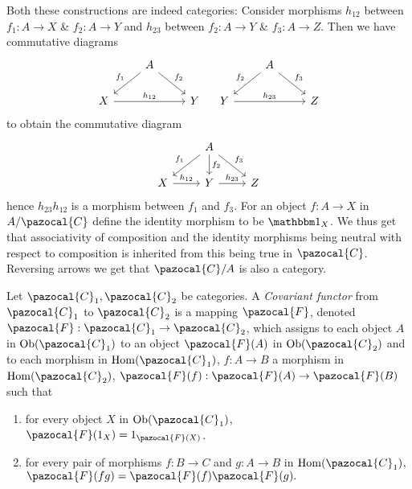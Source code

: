 \begin{remark}
    Both these constructions are indeed categories: Consider morphisms $h_{12}$ between $f_1: A\rightarrow X$ \& $f_2 : A\rightarrow Y$ and $h_{23}$ between $f_2 : A\rightarrow Y$ \& $f_3: A\rightarrow Z$. Then we have commutative diagrams
    $$\begin{tikzcd}
        & A \arrow[ld, "f_1"' ] \arrow[rd, "f_2"]\\
        X \arrow{rr}{h_{12}} & & Y
    \end{tikzcd} \quad \begin{tikzcd}  & A \arrow[ld, "f_2"' ] \arrow[rd, "f_3"]\\
        Y \arrow{rr}{h_{23}} & & Z \end{tikzcd}$$
    to obtain the commutative diagram
    $$\begin{tikzcd}
        & A \arrow[ld, "f_1"' ] \arrow[d, "f_2"] \arrow[rd, "f_3"]\\
        X \arrow[r, "h_{12}"] & Y \arrow[r, "h_{23}"] & Z
    \end{tikzcd}
    $$
    hence $h_{23}h_{12}$ is a morphism between $f_{1}$ and $f_3$. For an object $f: A \rightarrow X$ in $A/\pazocal{C}$ define the identity morphism to be $\fone_X$. We thus get that associativity of composition and the identity morphisms being neutral with respect to composition is inherited from this being true in $\pazocal{C}$. Reversing arrows we get that $\pazocal{C}/A$ is also a category.  
\end{remark}
\begin{definition}
    Let $\pazocal{C}_1,\pazocal{C}_2$ be categories. A \textit{Covariant functor} from $\pazocal{C}_1$ to $\pazocal{C}_2$ is a mapping $\pazocal{F}$, denoted $\pazocal{F} : \pazocal{C}_1 \rightarrow \pazocal{C}_2$, which assigns to each object $A$ in $\Ob(\pazocal{C}_1)$ to an object $\pazocal{F}(A)$ in $\Ob(\pazocal{C}_2)$ and to each morphism in $\Hom(\pazocal{C}_1)$, $f : A \rightarrow B$ a morphism in $\Hom(\pazocal{C}_2)$, $\pazocal{F}(f) : \pazocal{F}(A)\rightarrow \pazocal{F}(B)$ such that 
    \begin{enumerate}
        \item for every object $X$ in $\Ob(\pazocal{C}_1)$, $\pazocal{F}(1_X) = 1_{\pazocal{F}(X)}$.
        \item for every pair of morphisms $f: B \rightarrow C$ and $g: A\rightarrow B$ in $\Hom(\pazocal{C}_1)$, $\pazocal{F}(fg) =\pazocal{F}(f)\pazocal{F}(g).$
    \end{enumerate}
\end{definition}
